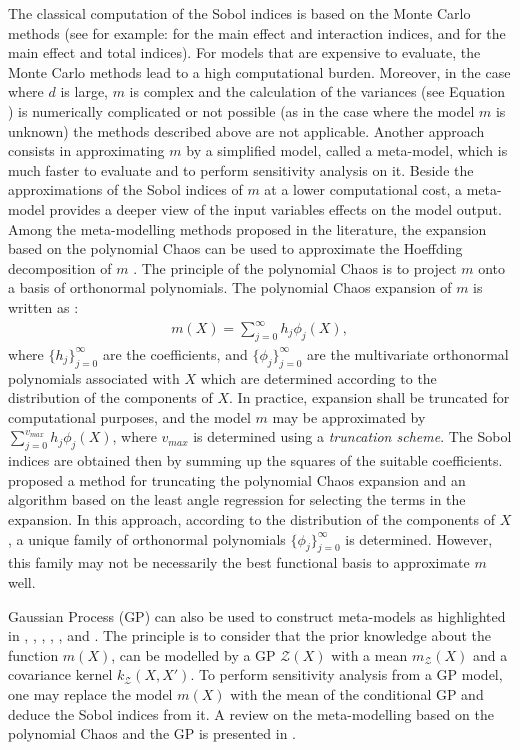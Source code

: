 The classical computation of the Sobol indices is based on the Monte Carlo methods (see for example: \citet{Sobol1993SensitivityEF} for the main effect and interaction indices, and \citet{SALTELLI2002280} for the main effect and total indices). For models that are expensive to evaluate, the Monte Carlo methods lead to a high computational burden. Moreover, in the case where $d$ is large, $m$ is complex and the calculation of the variances (see Equation ) is numerically complicated or not possible (as in the case where the model $m$ is unknown) the methods described above are not applicable. 
Another approach consists in approximating $m$ by a simplified model, called a meta-model, which is much faster to evaluate and to perform sensitivity analysis on it. Beside the approximations of the Sobol indices of $m$ at a lower computational cost, a meta-model provides a deeper view of the input variables effects on the model output.  
Among the meta-modelling methods proposed in the literature, the expansion based on the polynomial Chaos \citep{10.2307/2371268,schoutens2000stochastic} can be used to approximate the Hoeffding decomposition of $m$ \citep{SUDRET2008964}. 
The principle of the polynomial Chaos is to project $m$ onto a basis of orthonormal polynomials. The polynomial Chaos expansion of $m$ is written as \citep{doi:10.1137/S1064827503424505}:
\begin{align}
\label{ch3pc}
m(X)=\sum_{j=0}^\infty h_j\phi_j(X),
\end{align} 
where $\{h_j\}_{j=0}^\infty$ are the coefficients, and $\{\phi_j\}_{j=0}^\infty$ are the multivariate orthonormal polynomials associated with $X$ which are determined according to the distribution of the components of $X$. In practice, expansion  shall be truncated for computational purposes, and the model $m$ may be approximated by $\sum_{j=0}^{v_{max}} h_j\phi_j(X)$, where $v_{max}$ is determined using a \textit{truncation scheme}. 
The Sobol indices are obtained then by summing up the squares of the suitable coefficients. \citet{BlatmanSudret} proposed a method for truncating the polynomial Chaos expansion and an algorithm based on the least angle regression for selecting the terms in the expansion.
In this approach, according to the distribution of the components of $X$, a unique family of orthonormal polynomials $\{\phi_j\}_{j=0}^\infty$ is determined. However, this family may not be necessarily the best functional basis to approximate $m$ well.  
 
Gaussian Process (GP) can also be used to construct meta-models as highlighted in \citet{10.2307/1269548}, \citet{doi:10.1111/j.1467-9868.2004.05304.x}, \citet{Kleijnen:2007:DAS:1554802,KLEIJNEN2009707}, \citet{MARREL2009742}, \citet{Durrande2012}, and \citet{doi:10.1137/130926869}.
The principle is to consider that the prior knowledge about the function $m(X)$, can be modelled by a GP $\mathcal{Z}(X)$ with a mean $m_{\mathcal{Z}}(X)$ and a covariance kernel $k_{\mathcal{Z}}(X,X')$.   
To perform sensitivity analysis from a GP model, one may replace the model $m(X)$ with the mean of the conditional GP and deduce the Sobol indices from it. 
A review on the meta-modelling based on the polynomial Chaos and the GP is presented in \citet{LeGratiet2017}. 

